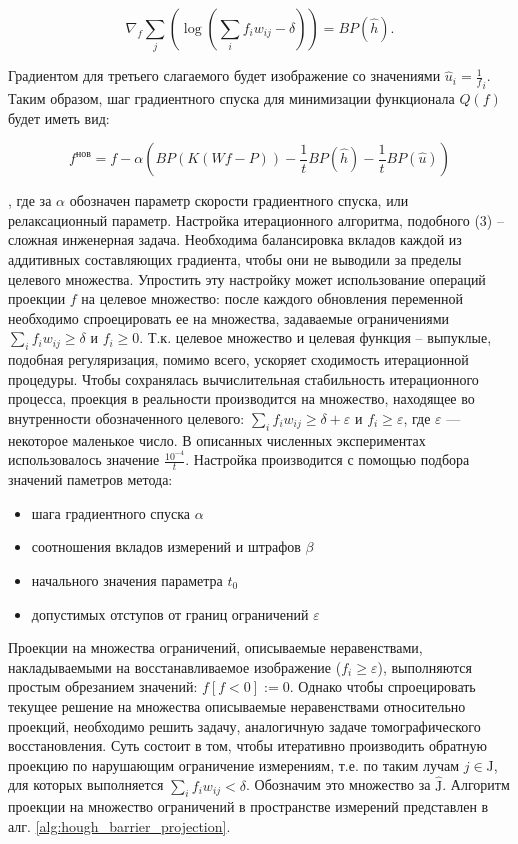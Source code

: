 $$
\nabla_f \sum_j {\left(
  \log{
    \left( \sum_i {f_i w_{ij}} - \delta \right)
  }
\right)} 
= BP(\hat{h}).
$$

Градиентом для третьего слагаемого будет изображение со значениями $\hat{u}_i = \frac 1 f_i$. Таким образом, шаг градиентного спуска для минимизации функционала $Q(f)$ будет иметь вид:

\begin{equation}
  \label{eq:barrier_method_gradstep}
  f^{\text{нов}} = f - \alpha \left(
    BP\left( K(Wf-P) \right) - 
    \frac 1 t BP(\hat{h}) - 
    \frac 1 t BP(\hat{u})
  \right)
\end{equation}

, где за $\alpha$ обозначен параметр скорости градиентного спуска, или релаксационный параметр.
Настройка итерационного алгоритма, подобного (3) – сложная инженерная задача.
Необходима балансировка вкладов каждой из аддитивных составляющих градиента, чтобы они не выводили за пределы целевого множества.
Упростить эту настройку может использование операций проекции $f$ на целевое множество: после каждого обновления переменной  необходимо спроецировать ее на множества, задаваемые ограничениями $\sum_i {f_i w_{ij}} \geq \delta$ и $f_i \geq 0$.
Т.к. целевое множество и целевая функция – выпуклые, подобная регуляризация, помимо всего, ускоряет сходимость итерационной процедуры.
Чтобы сохранялась вычислительная стабильность итерационного процесса, проекция в реальности производится на множество, находящее во внутренности обозначенного целевого: $\sum_i {f_i w_{ij}} \geq \delta + \varepsilon$ и $f_i \geq \varepsilon$, где $\varepsilon$ --- некоторое маленькое число.
В описанных численных экспериментах использовалось значение $\frac {10^{-4}}{t}$.
Настройка производится с помощью подбора значений паметров метода:
\begin{itemize}
  \item шага градиентного спуска $\alpha$
  \item соотношения вкладов измерений и штрафов $\beta$
  \item начального значения параметра $t_0$
  \item допустимых отступов от границ ограничений $\varepsilon$
\end{itemize}

Проекции на множества ограничений, описываемые неравенствами, накладываемыми на восстанавливаемое изображение ($f_i \geq \varepsilon$), выполняются простым обрезанием значений: $f[f < 0] := 0$.
Однако чтобы спроецировать текущее решение на множества описываемые неравенствами относительно проекций, необходимо решить задачу, аналогичную задаче томографического восстановления.
Суть состоит в том, чтобы итеративно производить обратную проекцию по нарушающим ограничение измерениям, т.е. по таким лучам $j \in \mathrm J$, для которых выполняется $\sum_i f_i w_{ij} < \delta$.
Обозначим это множество за $\hat{\mathrm J}$.
Алгоритм проекции на множество ограничений в пространстве измерений представлен в алг. \ref{alg:hough_barrier_projection}.

